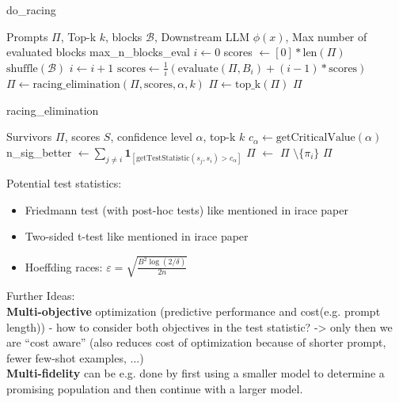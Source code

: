 \clearpage
\begin{algorithm}
    \caption{do\_racing}
    \begin{algorithmic}[1]
        \Require Prompts $\Pi$, Top-k $k$, blocks $\mathcal{B}$, Downstream LLM $\phi(x)$, Max number of evaluated blocks max\_n\_blocks\_eval
        \State $i \gets 0$
        \State scores $\gets [0]*\text{len}(\Pi)$
        \State $\text{shuffle}(\mathcal{B})$ 
        \State $i \gets i + 1$
        \State $\text{scores} \gets \frac{1}{i}\left(\text{evaluate}(\Pi, B_i) + (i-1)*\text{scores}\right)$ 
        \State $\Pi \gets \text{racing\_elimination}(\Pi, \text{scores}, \alpha, k)$
        \EndWhile
        \State $\Pi \gets \text{top\_k}(\Pi)$ 
        \EndIf
        \State \Return $\Pi$
    \end{algorithmic}
\end{algorithm}

\begin{algorithm}
    \caption{racing\_elimination}
    \begin{algorithmic}[1]
        \Require Survivors $\Pi$, scores $S$,  confidence level $\alpha$, top-k $k$
        \State $c_\alpha \gets \text{getCriticalValue}(\alpha)$
        \State n\_sig\_better $ \gets \sum_{j \neq i} \mathbf{1}_{\left[\text{getTestStatistic}(s_j, s_i) > c_{\alpha}\right]} $
        \State  $\Pi$ $\gets$  $\Pi$ $\setminus \{\pi_i\}$ 
        \EndIf
        \EndFor
        \State \Return  $\Pi$
    \end{algorithmic}
\end{algorithm}


Potential test statistics:
\begin{itemize}
    \item Friedmann test (with post-hoc tests) like mentioned in irace paper
    \item Two-sided t-test like mentioned in irace paper
    \item Hoeffding races: $\varepsilon = \sqrt{\frac{B^2\log(2/\delta)}{2n}}$
\end{itemize} 

Further Ideas:\\
\textbf{Multi-objective} optimization (predictive performance and cost(e.g. prompt length)) - how to consider both objectives in the test statistic? -> only then we are ``cost aware'' (also reduces cost of optimization because of shorter prompt, fewer few-shot examples, ...)\\
\textbf{Multi-fidelity} can be e.g. done by first using a smaller model to determine a promising population and then continue with a larger model.\\